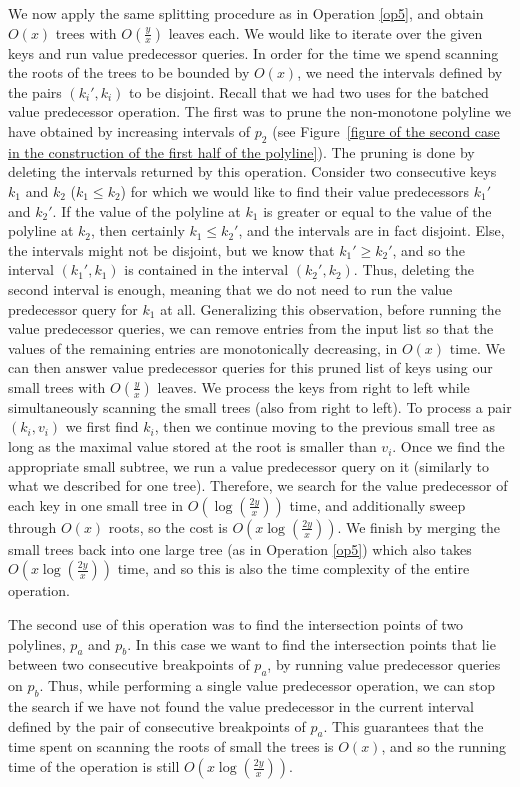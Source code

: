 \documentclass[11pt,a4paper]{article}
\theoremstyle{definition}
\theoremstyle{remark}
\begin{document}
We now apply the same splitting procedure as in Operation \ref{op5}, and obtain $O(x)$ trees with $O(\frac{y}{x})$ leaves each. We would like to iterate over the given keys and run value predecessor queries. 
In order for the time we spend scanning the roots of the trees to be bounded by $O(x)$, we need the intervals defined by the pairs $(k_i',k_i)$ to be disjoint. Recall that we had two uses for the batched value predecessor operation. The first was to prune the non-monotone polyline we have obtained by increasing intervals of $p_2$ (see Figure~\ref{figure of the second case in the construction of the first half of the polyline}). The pruning is done by deleting the intervals returned by this operation.
%
Consider two consecutive keys $k_1$ and $k_2$ ($k_1 \leq k_2$) for which we would like to find their value predecessors $k_1'$ and $k_2'$. If the value of the polyline at $k_1$  is greater or equal to the value  of the polyline at $k_2$, then certainly $k_1 \leq k_2'$, and the intervals are in fact disjoint. Else, the intervals might not be disjoint, but we know that $k_1' \geq k_2'$, and so the interval $(k_1',k_1)$ is contained in the interval $(k_2',k_2)$. Thus, deleting the second interval is enough, meaning that we do not need to run the value predecessor query for $k_1$ at all. Generalizing this observation, before running the value predecessor queries, we can remove entries from the input list
so that the values of the remaining entries are  monotonically decreasing, in $O(x)$ time. 
We can then answer value predecessor queries for this pruned list of keys using our small trees with $O(\frac{y}{x})$ leaves. We process the keys from right to left while simultaneously scanning the small trees (also from right to left). To process a pair $(k_{i},v_{i})$ we first find $k_{i}$, then we continue moving to the previous small tree as long as the maximal value stored at the root is smaller than $v_{i}$. Once we find the appropriate small subtree, we run a value predecessor query on it (similarly to what we described for one tree). 
%
Therefore, we search for the value predecessor of each key in one small tree in $O(\log(\frac{2y}{x}))$ time,
and additionally sweep through $O(x)$ roots, so the cost is $O(x \log (\frac{2y}{x}))$. We finish by merging the small trees back into one large tree (as in Operation \ref{op5}) which also takes $O(x \log (\frac{2y}{x}))$ time, and so this is also the time complexity of the entire operation.

The second use of this operation was to find the intersection points of two polylines, $p_a$ and $p_b$. In this case we want to find the intersection points that lie between two consecutive breakpoints of $p_a$, by running value predecessor queries on $p_b$. Thus, while performing a single value predecessor operation, we can stop the search if we have not found the value predecessor in the current interval defined by the pair of consecutive breakpoints of $p_a$. This guarantees that the time spent on scanning the roots of small the trees is $O(x)$, and so the running time of the operation is still $O(x \log (\frac{2y}{x}))$.
\end{document}
